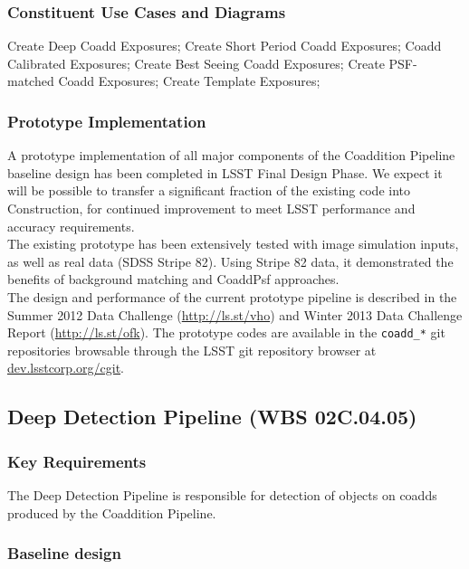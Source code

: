 \documentclass[12pt]{article}
\newcommand{\wbsDeepDet}{WBS 02C.04.05}
\begin{document}
\subsubsection{Constituent Use Cases and Diagrams}

Create Deep Coadd Exposures;
Create Short Period Coadd Exposures;
Coadd Calibrated Exposures;
Create Best Seeing Coadd Exposures;
Create PSF-matched Coadd Exposures;
Create Template Exposures;

\subsubsection{Prototype Implementation}

A prototype implementation of all major components of the Coaddition Pipeline baseline design has been completed in LSST Final Design Phase. We expect it will be possible to transfer a significant fraction of the existing code into Construction, for continued improvement to meet LSST performance and accuracy requirements.
\\

The existing prototype has been extensively tested with image simulation inputs, as well as real data (SDSS Stripe 82). Using Stripe 82 data, it demonstrated the benefits of background matching and CoaddPsf approaches.
\\

The design and performance of the current prototype pipeline is described in the Summer 2012 Data Challenge (\url{http://ls.st/vho}) and Winter 2013 Data Challenge Report (\url{http://ls.st/ofk}). The prototype codes are available in the {\tt coadd\_*} git repositories browsable through the LSST git repository browser at \url{dev.lsstcorp.org/cgit}.

\clearpage

\subsection{Deep Detection Pipeline (\wbsDeepDet)}

\subsubsection{Key Requirements}

The Deep Detection Pipeline is responsible for detection of objects on coadds produced by the Coaddition Pipeline.

\subsubsection{Baseline design}
\end{document}
